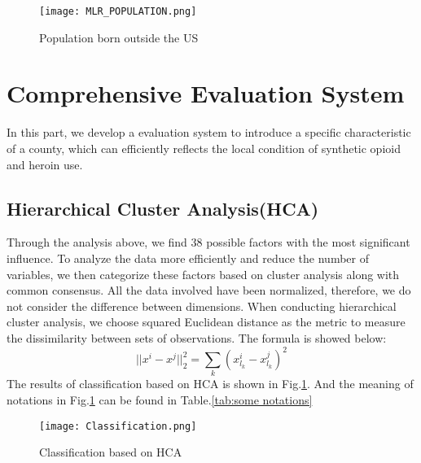 \documentclass{mcmthesis}
\begin{document}
\begin{figure}[!h]
\small
\centering
\texttt{[image: MLR\_POPULATION.png]}
\caption{Population born outside the US} %
\end{figure}


\section{Comprehensive Evaluation System} 

In this part, we develop a evaluation system to introduce a specific characteristic of a county, which can efficiently reflects the local condition of synthetic opioid and heroin use. \par

\subsection{Hierarchical Cluster Analysis(HCA)}
Through the analysis above, we find 38 possible factors with the most significant influence. To analyze the data more efficiently and reduce the number of variables, we then categorize these factors based on cluster analysis along with common consensus. 
All the data involved have been normalized, therefore, we do not consider the difference between dimensions. When conducting hierarchical cluster analysis, we choose squared Euclidean distance as the metric to measure the dissimilarity between sets of observations. The formula is showed below:
    \begin{equation} || x^i - x^j||_2^2= \sum\limits_{k} (x_{l_k}^i - x_{l_k}^j)^2 \end{equation}
   The results of classification based on HCA is shown in Fig.\ref{fig:classification}. And the meaning of notations in Fig.\ref{fig:classification} can be found in Table.\ref{tab:some notations}
\begin{figure}[h]
\small
\centering
\texttt{[image: Classification.png]}
\caption{Classification based on HCA} \label{fig:classification}
\end{figure}
\end{document}
